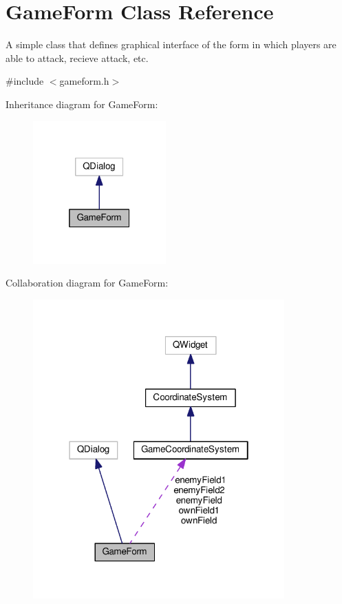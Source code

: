 \hypertarget{classGameForm}{}\section{Game\+Form Class Reference}
\label{classGameForm}


A simple class that defines graphical interface of the form in which players are able to attack, recieve attack, etc.  




{\ttfamily \#include $<$gameform.\+h$>$}



Inheritance diagram for Game\+Form\+:\nopagebreak
\begin{figure}[H]
\begin{center}
\leavevmode
\includegraphics[width=145pt]{classGameForm__inherit__graph}
\end{center}
\end{figure}


Collaboration diagram for Game\+Form\+:\nopagebreak
\begin{figure}[H]
\begin{center}
\leavevmode
\includegraphics[width=274pt]{classGameForm__coll__graph}
\end{center}
\end{figure}
